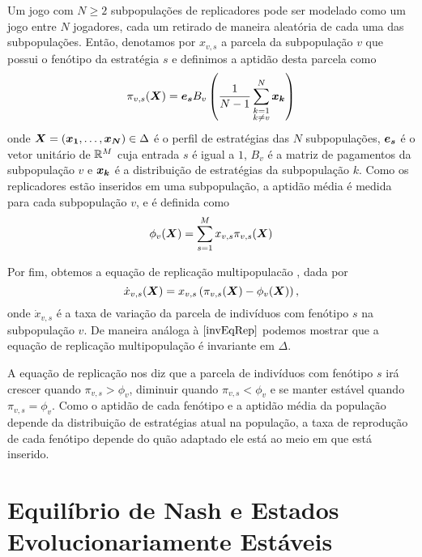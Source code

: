 Um jogo com $N\geq 2$ subpopulações de replicadores pode ser modelado como um jogo entre $N$ jogadores, cada um retirado de maneira aleatória de cada uma das subpopulações. Então, denotamos por $x_{v,s}$ a parcela da subpopulação $v$ que possui o fenótipo da estratégia $s$ e definimos a aptidão desta parcela como
\begin{equation}
    \label{defPgtoEvolucionario}
    \pi_{v,s}(\boldsymbol{X})=\boldsymbol{e_s} B_v \left(\frac{1}{N-1}\sum_{\substack{k=1\\k\neq v}}^N \boldsymbol{x_k}\right)
\end{equation}
onde $\boldsymbol{X}=(\boldsymbol{x_1},\dots,\boldsymbol{x_N})\in\Delta$ é o perfil de estratégias das $N$ subpopulações, $\boldsymbol{e_s}$ é o vetor unitário de $\mathbb{R}^M$ cuja entrada $s$ é igual a $1$, $B_v$ é a matriz de pagamentos da subpopulação $v$ e $\boldsymbol{x_k}$ é a distribuição de estratégias da subpopulação $k$. Como os replicadores estão inseridos em uma subpopulação, a aptidão média é medida para cada subpopulação $v$, e é definida como
\begin{equation}
    \label{defPgtoMedioEvolucionario}
    \phi_{v}(\boldsymbol{X})=\sum^M_{s=1}x_{v,s}\pi_{v,s}(\boldsymbol{X})
\end{equation}

Por fim, obtemos a equação de replicação multipopulacão \cite{weibull1997evolutionary}, dada por
\begin{equation}
    \label{eqRepMultipop}
    \dot{x}_{v,s}(\boldsymbol{X})=x_{v,s}\left(\pi_{v,s}(\boldsymbol{X})-\phi_{v}(\boldsymbol{X})\right),
\end{equation}
onde $\dot{x}_{v,s}$ é a taxa de variação da parcela de indivíduos com fenótipo $s$ na subpopulação $v$. De maneira análoga à $\eqref{invEqRep}$ podemos mostrar que a equação de replicação multipopulação é invariante em $\Delta$.

A equação de replicação nos diz que a parcela de indivíduos com fenótipo $s$ irá crescer quando $\pi_{v,s}>\phi_v$, diminuir quando $\pi_{v,s}<\phi_v$ e se manter estável quando $\pi_{v,s}=\phi_v$. Como o aptidão de cada fenótipo e a aptidão média da população depende da distribuição de estratégias atual na população, a taxa de reprodução de cada fenótipo depende do quão adaptado ele está ao meio em que está inserido.


\section{Equilíbrio de Nash e Estados Evolucionariamente Estáveis}

